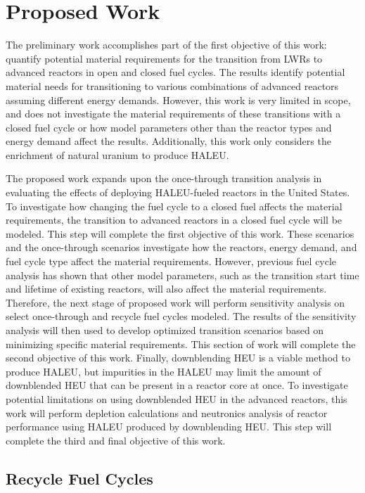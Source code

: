 \section{Proposed Work}
The preliminary work accomplishes part of the first objective of this work: 
quantify potential material requirements for the transition from 
\glspl{LWR}
to advanced reactors in open and closed fuel cycles. The results identify 
potential material needs for transitioning to various combinations of 
advanced reactors assuming different energy demands. However, this work 
is very limited in scope, and does not investigate the material requirements 
of these transitions with a closed fuel cycle or how model parameters 
other 
than the reactor types and energy demand affect the results. Additionally, 
this work only considers the enrichment of natural uranium to produce 
\gls{HALEU}. 

The proposed work expands upon the once-through transition analysis in 
evaluating the effects of deploying \gls{HALEU}-fueled reactors in the 
United States. 
To investigate how changing the fuel cycle to a closed fuel affects the 
material requirements, the transition to advanced reactors in a closed fuel 
cycle will be modeled. This step will complete the first 
objective of this work. These scenarios and the once-through scenarios 
investigate how the reactors, energy demand, and fuel cycle type affect 
the material requirements. However, previous fuel cycle analysis has 
shown that other model parameters, such as the transition start time 
and lifetime of existing reactors, will also affect the material 
requirements. Therefore, 
the next stage of proposed work will perform sensitivity analysis on 
select once-through and recycle fuel cycles modeled. The results of the 
sensitivity 
analysis will then used to develop optimized transition scenarios based 
on minimizing specific material requirements. This section of work will 
complete the second objective of this work. Finally, downblending 
\gls{HEU} is a viable 
method to produce \gls{HALEU}, but impurities in the \gls{HALEU} may limit 
the amount of downblended \gls{HEU} that can be present in a reactor core 
at once. To investigate potential limitations on using downblended 
\gls{HEU} in the advanced reactors, this work will perform depletion 
calculations and neutronics analysis of reactor performance using 
\gls{HALEU} produced by 
downblending \gls{HEU}. This step will complete the third and final
objective of this work. 

\subsection{Recycle Fuel Cycles}

